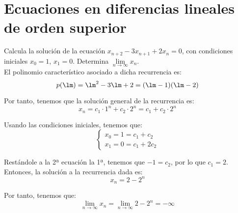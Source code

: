 \section{Ecuaciones en diferencias lineales de orden superior}

\begin{ejercicio}
    Calcula la solución de la ecuación $x_{n+2} - 3x_{n+1} + 2x_n = 0$, con condiciones iniciales $x_0 = 1$, $x_1 = 0$. Determina
    $\lim\limits_{n\to\infty} x_n$.\\

    El polinomio característico asociado a dicha recurrencia es:
    \begin{equation*}
        p(\lm) = \lm^2-3\lm+2 = (\lm-1)(\lm-2)
    \end{equation*}

    Por tanto, tenemos que la solución general de la recurrencia es:
    \begin{equation*}
        x_n = c_1\cdot 1^n + c_2\cdot 2^n = c_1+c_2\cdot 2^n
    \end{equation*}

    Usando las condiciones iniciales, tenemos que:
    \begin{equation*}
        \left\{
        \begin{array}{l}
            x_0=1=c_1+c_2\\
            x_1=0=c_1+2c_2
        \end{array}
        \right.
    \end{equation*}

    Restándole a la 2ª ecuación la 1ª, tenemos que $-1=c_2$, por lo que $c_1=2$. Entonces, la solución a la recurrencia dada es:
    \begin{equation*}
        x_n = 2- 2^n
    \end{equation*}

    Por tanto, tenemos que:
    \begin{equation*}
        \lim_{n\to \infty} x_n
        = \lim_{n\to \infty} 2- 2^n = -\infty
    \end{equation*}
\end{ejercicio}

